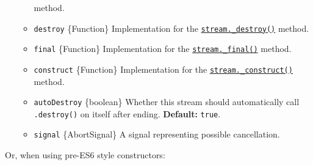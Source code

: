 \begin{itemize}
\begin{itemize}
    method.
  \item
    \texttt{destroy} \{Function\} Implementation for the
    \hyperref[writable_destroyerr-callback]{\texttt{stream.\_destroy()}}
    method.
  \item
    \texttt{final} \{Function\} Implementation for the
    \hyperref[writable_finalcallback]{\texttt{stream.\_final()}} method.
  \item
    \texttt{construct} \{Function\} Implementation for the
    \hyperref[writable_constructcallback]{\texttt{stream.\_construct()}}
    method.
  \item
    \texttt{autoDestroy} \{boolean\} Whether this stream should
    automatically call \texttt{.destroy()} on itself after ending.
    \textbf{Default:} \texttt{true}.
  \item
    \texttt{signal} \{AbortSignal\} A signal representing possible
    cancellation.
  \end{itemize}
\end{itemize}

\begin{Shaded}
\begin{Highlighting}[]
\OperatorTok{=} \NormalTok{(}\NormalTok{)}\OperatorTok{;}

    \OperatorTok{;}
\NormalTok{  \}}
\NormalTok{\}}
\end{Highlighting}
\end{Shaded}

Or, when using pre-ES6 style constructors:

\begin{Shaded}
\begin{Highlighting}[]
\OperatorTok{=} \NormalTok{(}\NormalTok{)}\OperatorTok{;}
\OperatorTok{=} \NormalTok{(}\NormalTok{)}\OperatorTok{;}

 
  \NormalTok{ (}\OperatorTok{!}\NormalTok{(} 
      \OperatorTok{;}
\NormalTok{(}\OperatorTok{,}\OperatorTok{;}
\NormalTok{\}}
\OperatorTok{,}\OperatorTok{;}
\end{Highlighting}
\end{Shaded}

